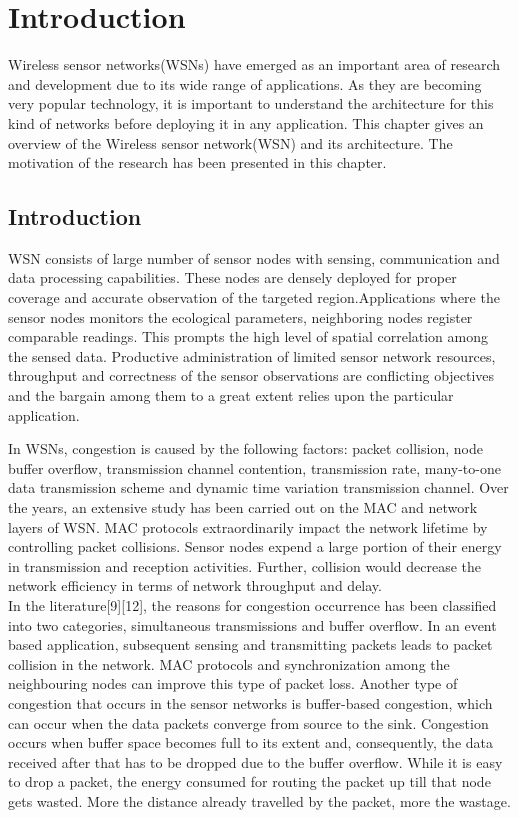\chapter{Introduction}
\label{introchap}
Wireless sensor networks(WSNs) have emerged as an important area of research and development due to its wide range of applications. As they are becoming very popular technology, it is important to understand the architecture for this kind of networks before deploying it in any application.
This chapter gives an overview of the Wireless sensor network(WSN) and its architecture. The motivation of the research has been presented in this chapter.  
\section{Introduction}
WSN consists  of large number of sensor nodes with sensing, communication and data processing capabilities. These nodes are densely deployed for proper coverage and accurate observation of the targeted region.Applications where the sensor nodes monitors the ecological parameters, neighboring nodes register comparable readings. This prompts the high level of spatial correlation among the sensed data. Productive administration of limited sensor network resources, throughput and correctness of the sensor observations are conflicting objectives and the bargain among them to a great extent relies upon the particular application.
\par
In WSNs, congestion is caused by the following factors: packet collision, node buffer overflow, transmission channel contention, transmission rate, many-to-one data transmission scheme and dynamic time variation transmission channel. Over the years, an extensive study has been carried out on the MAC and network layers of WSN. MAC protocols extraordinarily impact the network lifetime by controlling packet collisions. Sensor nodes expend a large portion of their energy in transmission and reception activities. Further, collision would decrease the network efficiency in terms of network throughput and delay.\\
In the literature[9][12], the reasons for congestion occurrence has been classified into two categories, simultaneous transmissions and buffer overflow. In an event based application, subsequent sensing and transmitting packets leads to packet collision in the network. MAC protocols and synchronization among the neighbouring nodes can improve this type of packet loss. Another type of congestion that occurs in the sensor networks is buffer-based congestion, which can occur when the data packets converge from source to the sink. Congestion occurs when buffer space becomes full to its extent and, consequently, the data received after that has to be dropped due to the buffer overflow.  While it is easy to drop a packet, the energy consumed for routing the packet up till that node gets wasted. More the distance already travelled by the packet, more the wastage.
